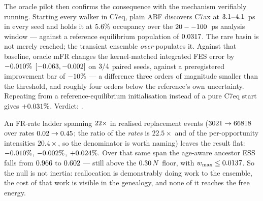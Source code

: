 The oracle pilot then confirms the consequence with the mechanism verifiably running.
Starting every walker in C7eq, plain ABF discovers C7ax at $3.1$--$4.1$~ps
in every seed and holds it at $5.6\%$ occupancy over the $20--100$~ps analysis
window --- against a reference equilibrium population of $0.0317$. The rare basin is not
merely reached; the transient ensemble \emph{over}-populates it. Against that baseline,
oracle mFR changes the kernel-matched integrated FES error by $-0.010\%$
$[-0.063, -0.002]$ on $3/4$ paired seeds, against a preregistered
improvement bar of $-10\%$ --- a difference three orders of magnitude smaller than
the threshold, and roughly four orders below the reference's own uncertainty. Repeating from
a reference-equilibrium initialisation instead of a pure C7eq start gives $+0.031\%$.
Verdict: \textbf{\AlaVerdict}.

An FR-rate ladder spanning $22\times$ in realised replacement events
($3021 \to 66818$ over rates $0.02 \to 0.45$; the ratio of the
\emph{rates} is $22.5\times$ and of the per-opportunity intensities $20.4\times$, so the
denominator is worth naming) leaves the result flat: $-0.010\%$, $-0.002\%$,
$+0.024\%$. Over that same span the age-aware ancestor ESS falls from $0.966$ to
$0.602$ --- still above the $0.30\,N$ floor, with $w_{\max} \le 0.0137$. So the
null is not inertia: reallocation is demonstrably doing work to the ensemble, the cost of
that work is visible in the genealogy, and none of it reaches the free energy.

